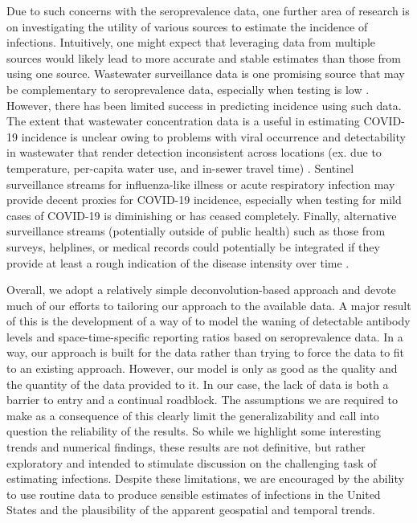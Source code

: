 \documentclass{article}
\begin{document}
Due to such concerns with the seroprevalence data, one further area of research
is on investigating the utility of various sources to estimate the incidence of
infections. Intuitively, one might expect that leveraging data from multiple
sources would likely lead to more accurate and stable estimates than those from
using one source. Wastewater surveillance data is one
promising source that may be complementary to seroprevalence data, especially
when testing is low \citep{mcmanus2023predicting}. However, there has been
limited success in predicting incidence using such data. The extent that
wastewater concentration data is a useful in estimating COVID-19 incidence is
unclear owing to problems with viral occurrence and detectability in wastewater
that render detection inconsistent across locations (ex. due to temperature,
per-capita water use, and in-sewer travel time) \citep{mcmanus2023predicting,
hart2020computational, li2023correlation}. Sentinel surveillance streams for
influenza-like illness or acute respiratory infection may provide decent proxies
for COVID-19 incidence, especially when testing for mild cases of COVID-19 is
diminishing or has ceased completely. Finally, alternative surveillance streams
(potentially outside of public health) such as those from surveys, helplines, or
medical records could potentially be integrated if they provide at least a rough
indication of the disease intensity over time \citep{ecdc2020strategies}.

Overall, we adopt a relatively simple deconvolution-based approach and devote
much of our efforts to tailoring our approach to the available data. A
major result of this is the development of a way of to model the waning
of detectable antibody levels and space-time-specific reporting ratios based on seroprevalence data.
In a way, our approach is built for the data rather than trying to force the data to fit
to an existing approach. However, our model is only as good as the quality and
the quantity of the data provided to it. In our case, the lack of data is both a barrier to entry
and a continual roadblock. The assumptions we are required to make as a
consequence of this clearly limit the generalizability and call into question
the reliability of the results. So while we highlight some interesting trends and
numerical findings, these results are not definitive, but rather exploratory and
intended to stimulate discussion on the challenging task of estimating
infections. Despite these limitations, we are encouraged by the ability to use
routine data to produce sensible estimates of infections in the United States and the
plausibility of the apparent geospatial and temporal trends. 
 
\end{document}
